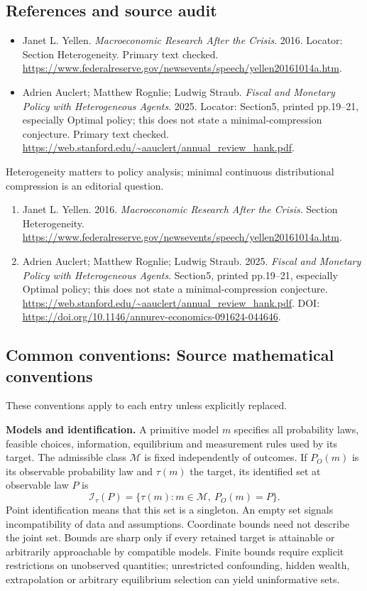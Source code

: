 \documentclass[11pt,a4paper]{article}
\begin{document}
\subsection*{References and source audit}
\begin{itemize}
\item Janet L. Yellen. \emph{Macroeconomic Research After the Crisis}. 2016. Locator: Section Heterogeneity. Primary text checked. \url{https://www.federalreserve.gov/newsevents/speech/yellen20161014a.htm}.
\item Adrien Auclert; Matthew Rognlie; Ludwig Straub. \emph{Fiscal and Monetary Policy with Heterogeneous Agents}. 2025. Locator: Section5, printed pp.19--21, especially Optimal policy; this does not state a minimal-compression conjecture. Primary text checked. \url{https://web.stanford.edu/~aauclert/annual_review_hank.pdf}.
\end{itemize}
Heterogeneity matters to policy analysis; minimal continuous distributional compression is an editorial question.
\begin{enumerate}\raggedright
\item\hypertarget{definitions:source:30007515:1}{} Janet L. Yellen. 2016. \emph{Macroeconomic Research After the Crisis}. Section Heterogeneity.
\url{https://www.federalreserve.gov/newsevents/speech/yellen20161014a.htm}.
\item\hypertarget{definitions:source:30007515:2}{} Adrien Auclert; Matthew Rognlie; Ludwig Straub. 2025. \emph{Fiscal and Monetary Policy with Heterogeneous Agents}. Section5, printed pp.19--21, especially Optimal policy; this does not state a minimal-compression conjecture.
\url{https://web.stanford.edu/~aauclert/annual_review_hank.pdf}.
DOI: \url{https://doi.org/10.1146/annurev-economics-091624-044646}.
\end{enumerate}

\subsection*{Common conventions: Source mathematical conventions}

These conventions apply to each entry unless explicitly replaced.

\textbf{Models and identification.} A primitive model \(m\) specifies all probability laws, feasible choices, information, equilibrium and measurement rules used by its target. The admissible class \(\mathcal M\) is fixed independently of outcomes. If \(P_O(m)\) is its observable probability law and \(\tau(m)\) the target, its identified set at observable law \(P\) is
\[
 \mathcal I_\tau(P)=\{\tau(m):m\in\mathcal M,\ P_O(m)=P\}.
\]
Point identification means that this set is a singleton. An empty set signals incompatibility of data and assumptions. Coordinate bounds need not describe the joint set. Bounds are sharp only if every retained target is attainable or arbitrarily approachable by compatible models. Finite bounds require explicit restrictions on unobserved quantities; unrestricted confounding, hidden wealth, extrapolation or arbitrary equilibrium selection can yield uninformative sets.
\end{document}
